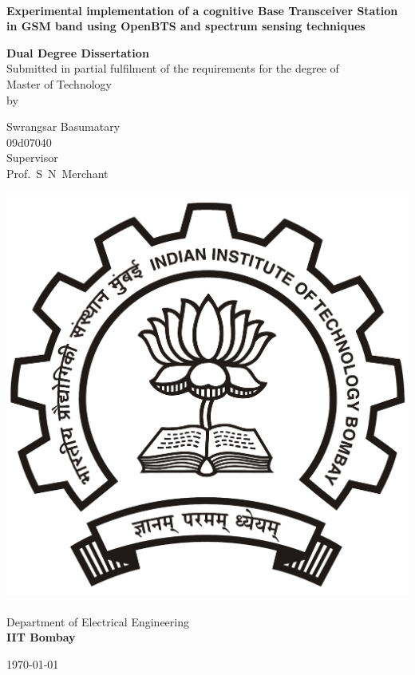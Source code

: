\begin{titlepage}
\begin{center}
\begin{spacing}{1.0}


~\\[0.3cm]
{ \LARGE \bfseries  Experimental implementation of a cognitive Base 
Transceiver Station in GSM band using OpenBTS and spectrum sensing 
techniques\\[1.2cm] }

\textbf{\large Dual Degree Dissertation}\\[1.2cm]

{Submitted in partial fulfilment of the requirements for the degree 
of\\[0.1cm]
Master of Technology\\[0.3cm]
by\\[0.3cm]}

{\LARGE Swrangsar Basumatary \\[0.1cm]}
{09d07040 \\[1.1cm]}
{Supervisor \\[0.1cm]}
{\LARGE Prof.~S~N~Merchant \\[1.3cm]}

\includegraphics[width=0.21\textheight]{iitbLogo}~\\[0.9cm]
Department of Electrical Engineering\\[0.2cm]
\textbf{\large IIT Bombay}\\[1.3cm]


\vfill

{\large \today}

\end{spacing}
\end{center}
\end{titlepage}
